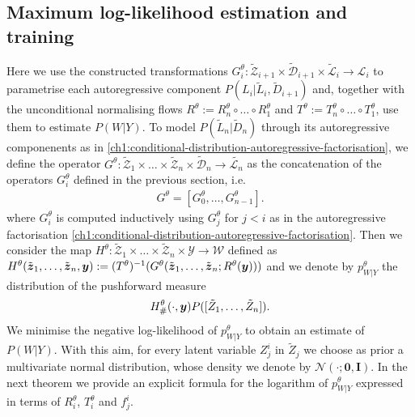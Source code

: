 \subsection{Maximum log-likelihood estimation and training}
Here we use the constructed transformations $G_i^\theta : \tilde{\mathcal{Z}}_{i+1} \times  \tilde{\mathcal{D}}_{i+1} \times  \tilde{\mathcal{L}}_{i} \rightarrow \mathcal{L}_{i}$ to parametrise each autoregressive component $P(L_i|\tilde{L}_{i},\tilde D_{i+1})$ and, together with the unconditional normalising flows $R^{\theta} := R^\theta_n \circ \ldots \circ R^\theta_1$ and $T^{\theta}:= T^\theta_n \circ \ldots \circ T^\theta_1$, use them to estimate $P(W|Y)$. To model $ P(\tilde{L}_n| \tilde{D}_n)$ through its autoregressive componenents as in \eqref{ch1:conditional-distribution-autoregressive-factorisation}, we define 
the operator $G^\theta : \tilde{\mathcal{Z}}_{1} \times \ldots \times \tilde{\mathcal{Z}}_{n} \times  \tilde{\mathcal{D}}_{n}  \rightarrow \tilde{\mathcal{L}_{n}}$ as the concatenation of the operators $G^\theta_i$ defined in the previous section, i.e. 
\begin{align}\label{ch1:eq:G}
    G^\theta = [G^\theta_0, \ldots, G^\theta_{n-1}].
\end{align}
where $G^\theta_i$ is computed inductively using $G^\theta_j$ for $j<i$ as in the autoregressive factorisation \eqref{ch1:conditional-distribution-autoregressive-factorisation}.
Then we consider the map $H^\theta :  \tilde{\mathcal{Z}}_{1} \times \ldots \times \tilde{\mathcal{Z}}_{n} \times \mathcal{Y}\rightarrow \mathcal{W}$ defined as  $H^\theta(\tilde {\boldsymbol{z}}_1, \ldots, \tilde {\boldsymbol{z}}_n, \boldsymbol{y}):= (T^\theta)^{-1}( G^\theta(\tilde {\boldsymbol{z}}_1, \ldots, \tilde {\boldsymbol{z}}_n ; R^\theta(\boldsymbol{y})))$ and we denote by $p^\theta_{W|Y}$ the distribution of the pushforward measure
\begin{align}
    H^\theta_\#(\cdot, \boldsymbol{y}) P([\tilde Z_{1}, \ldots, \tilde Z_{n}]).
\end{align}
We minimise the negative log-likelihood of $p^\theta_{W|Y}$ to obtain an estimate of $P(W|Y)$.
With this aim, for every latent variable $Z_j^i$ in $\tilde Z_j$ we choose as prior a multivariate normal distribution, whose density we denote by $\mathcal{N}(\cdot; \textbf{0}, \textbf{I})$.
In the next theorem we provide an explicit formula for the logarithm of $p^\theta_{W|Y}$ expressed in terms of $R^\theta_i$, $T^\theta_i$ and $f^i_j$.

